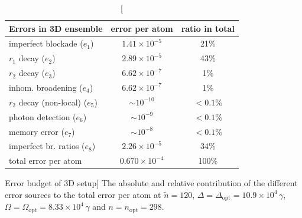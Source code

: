 \begin{table}
\centering
\begin{tabular}{|l|c|c|}
\hline
 Errors in 3D ensemble & error per atom & ratio in total\\
\hline
imperfect blockade ($e_1$) & $1.41 \times 10^{-5}$ & 21\%\\
$r_1$ decay ($e_2$) & $2.89 \times 10^{-5}$ & 43\%\\
$r_2$ decay ($e_3$) & $6.62 \times 10^{-7}$ & 1\%\\
inhom. broadening ($e_4$) & $6.62 \times 10^{-7}$ & 1\%\\
$r_2$ decay (non-local) ($e_5$) & $ \sim 10^{-10}$ & $<0.1$\%\\
photon detection ($e_6$) & $ \sim 10^{-9}$ & $<0.1$\%\\
memory error ($e_7$) & $ \sim 10^{-8}$ & $<0.1$\%\\
imperfect br. ratios ($e_8$) & $2.26 \times 10^{-5}$ & 34\%\\
\hline
total error per atom & $0.670 \times 10^{-4}$ & 100\%\\
\hline
\end{tabular}
\caption
[Error budget of 3D setup]
{
\label{table:errors_3D}
The absolute and relative contribution of the different error sources to the
total error per atom at $\tilde n = 120$, $\Delta =
\Delta_\mathrm{opt} = 10.9\times 10^4\,\gamma$, $\Omega = \Omega_\mathrm{opt} = 
8.33\times 10^4\,\gamma$ and $n = n_\mathrm{opt} = 298$.}
\end{table}


